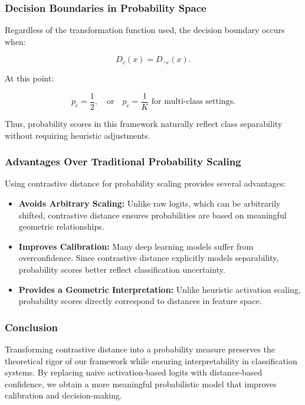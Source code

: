 \documentclass[12pt]{article}
\begin{document}
\subsubsection{Decision Boundaries in Probability Space}

Regardless of the transformation function used, the decision boundary occurs when:

\[
D_c(x) = D_{\neg c}(x).
\]

At this point:

\[
p_c = \frac{1}{2}, \quad \text{or} \quad p_c = \frac{1}{K} \text{ for multi-class settings}.
\]

Thus, probability scores in this framework naturally reflect class separability without requiring heuristic adjustments.

\subsubsection{Advantages Over Traditional Probability Scaling}

Using contrastive distance for probability scaling provides several advantages:

\begin{itemize}
    \item \textbf{Avoids Arbitrary Scaling:} Unlike raw logits, which can be arbitrarily shifted, contrastive distance ensures probabilities are based on meaningful geometric relationships.
    \item \textbf{Improves Calibration:} Many deep learning models suffer from overconfidence. Since contrastive distance explicitly models separability, probability scores better reflect classification uncertainty.
    \item \textbf{Provides a Geometric Interpretation:} Unlike heuristic activation scaling, probability scores directly correspond to distances in feature space.
\end{itemize}

\subsubsection{Conclusion}

Transforming contrastive distance into a probability measure preserves the theoretical rigor of our framework while ensuring interpretability in classification systems. By replacing naive activation-based logits with distance-based confidence, we obtain a more meaningful probabilistic model that improves calibration and decision-making.
\end{document}
